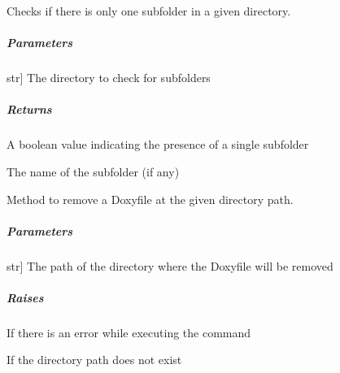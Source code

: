 \documentclass[letterpaper,10pt,english]{sphinxmanual}
\begin{document}
\begin{fulllineitems}
\begin{fulllineitems}
\label{\detokenize{main.doxygen_management:main.doxygen_management.doxyfile_configurator.DoxyfileConfigurator.get_single_subfolder}}
\pysigstartsignatures
{}
\pysigstopsignatures
\sphinxAtStartPar
Checks if there is only one subfolder in a given directory.


\subparagraph{Parameters}
\label{\detokenize{main.doxygen_management:id14}}\begin{description}
\sphinxlineitem{directory}{[}str{]}
\sphinxAtStartPar
The directory to check for subfolders

\end{description}


\subparagraph{Returns}
\label{\detokenize{main.doxygen_management:id15}}\begin{description}
\sphinxAtStartPar
A boolean value indicating the presence of a single subfolder

\sphinxAtStartPar
The name of the subfolder (if any)

\end{description}

\end{fulllineitems}


\begin{fulllineitems}
\label{\detokenize{main.doxygen_management:main.doxygen_management.doxyfile_configurator.DoxyfileConfigurator.remove_doxyfile_if_exists}}
\pysigstartsignatures
{}
\pysigstopsignatures
\sphinxAtStartPar
Method to remove a Doxyfile at the given directory path.


\subparagraph{Parameters}
\label{\detokenize{main.doxygen_management:id16}}\begin{description}
\sphinxlineitem{directory\_path}{[}str{]}
\sphinxAtStartPar
The path of the directory where the Doxyfile will be removed

\end{description}


\subparagraph{Raises}
\label{\detokenize{main.doxygen_management:id17}}\begin{description}
\sphinxAtStartPar
If there is an error while executing the command

\sphinxAtStartPar
If the directory path does not exist

\end{description}

\end{fulllineitems}


\end{fulllineitems}
\end{document}
